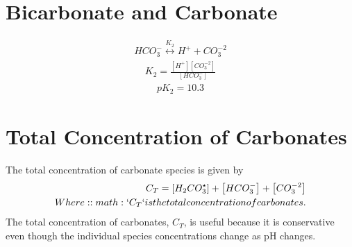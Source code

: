 \documentclass[letterpaper,10pt,english]{sphinxmanual}
\begin{document}
\section{Bicarbonate and Carbonate}
\label{\detokenize{Rapid_Mix/RM_Examples:bicarbonate-and-carbonate}}\label{\detokenize{Rapid_Mix/RM_Examples:heading-bicarbonate-and-carbonate}}\begin{equation}\label{equation:Rapid_Mix/RM_Examples:Rapid_Mix/RM_Examples:2}
\begin{split}HCO_3^ - \overset {{K_2}} \longleftrightarrow {H^ + } + CO_3^{ - 2}\end{split}
\end{equation}\begin{equation}\label{equation:Rapid_Mix/RM_Examples:Rapid_Mix/RM_Examples:3}
\begin{split}{K_2} = \frac{{\left[ {{H^ + }} \right]\left[ {CO_3^{ - 2}} \right]}}{{\left[ {HCO_3^ - } \right]}}\end{split}
\end{equation}\begin{equation}\label{equation:Rapid_Mix/RM_Examples:Rapid_Mix/RM_Examples:4}
\begin{split}p{K_2} = 10.3\end{split}
\end{equation}

\section{Total Concentration of Carbonates}
\label{\detokenize{Rapid_Mix/RM_Examples:total-concentration-of-carbonates}}\label{\detokenize{Rapid_Mix/RM_Examples:heading-total-concentration-of-carbonates}}
The total concentration of carbonate species is given by
\begin{align}\label{equation:Rapid_Mix/RM_Examples:Rapid_Mix/RM_Examples:5}\!\begin{aligned}
{C_T} = \left[ {{H_2}CO_3^{\star} } \right] + \left[ {HCO_3^ - } \right] + \left[ {CO_3^{ - 2}} \right]\\
Where: :math:`{C_T}` is the total concentration of carbonates.\\
\end{aligned}\end{align}
The total concentration of carbonates, \({C_T}\), is useful because it is conservative even though the individual species concentrations change as pH changes.
\end{document}
